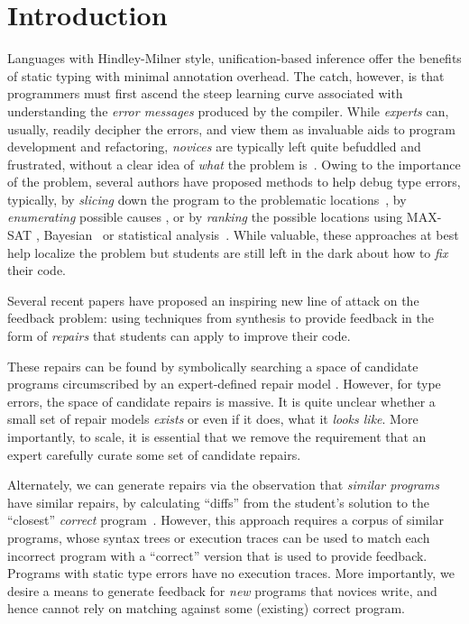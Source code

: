 \section{Introduction}
\label{sec:intro}

%
Languages with Hindley-Milner style, unification-based inference offer the
benefits of static typing with minimal annotation overhead. The catch, however,
is that programmers must first ascend the steep learning curve associated with
understanding the \emph{error messages} produced by the compiler.
%
While \emph{experts} can, usually, readily decipher the errors, and view them as
invaluable aids to program development and refactoring, \emph{novices} are
typically left quite befuddled and frustrated, without a clear idea of
\emph{what} the problem is~\citep{Wand1986-nw}.
%
Owing to the importance of the problem, several authors have proposed methods to
help debug type errors, typically, by \emph{slicing} down the program to the
problematic locations~\citep{Haack2003-vc, Rahli2015-tt}, by \emph{enumerating}
possible causes \citep{Lerner2007-dt, Chen2014-gd}, or by \emph{ranking} the
possible locations using MAX-SAT \citep{Pavlinovic2014-mr},
Bayesian~\citep{Zhang2014-lv} or statistical analysis~\citep{Seidel:2017}.
%
While valuable, these approaches at best help localize the problem but students
are still left in the dark about how to \emph{fix} their code.

%
Several recent papers have proposed an inspiring new line of
attack on the feedback problem: using techniques from synthesis
to provide feedback in the form of \emph{repairs} that students
can apply to improve their code.

These repairs can be found by symbolically searching a space 
of candidate programs circumscribed by an expert-defined repair 
model \citep{singh2013,HeadGSSFDH17}.
%
However, for type errors, the space of candidate repairs is massive.
It is quite unclear whether a small set of repair models \emph{exists}
or even if it does, what it \emph{looks like}. More importantly,
to scale, it is essential that we remove the requirement that an
expert carefully curate some set of candidate repairs.

Alternately, we can generate repairs via the
observation that \emph{similar programs} have 
similar repairs, \ie by calculating ``diffs'' 
from the student's solution to the ``closest'' 
\emph{correct} program~\citep{Gulwani_2018,Wang_2018}.
%
However, this approach requires a corpus of similar programs,
whose syntax trees or execution traces can be used to match
each incorrect program with a ``correct'' version that is
used to provide feedback. Programs with static type errors
have no execution traces.
%
More importantly, we desire a means to generate feedback
for \emph{new} programs that novices write, and hence
cannot rely on matching against some (existing) correct
program.

